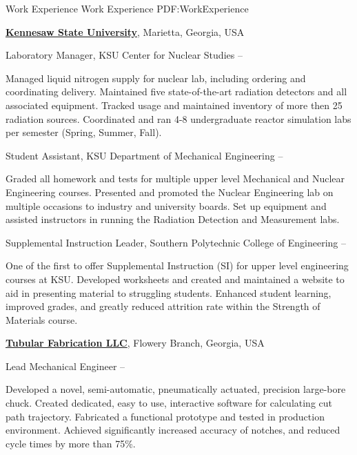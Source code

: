 \documentclass[letterpaper,MMMyyyy,nonstopmode]{resume}
\begin{document}
\begin{Body}

\Section
{Work Experience}
{Work Experience}
{PDF:WorkExperience}

\Entry
\href{http://kennesaw.edu/}
{\textbf{Kennesaw State University}},
Marietta, Georgia, USA

\Gap
\BulletItem
Laboratory Manager,
KSU Center for Nuclear Studies
\hfill
{} --
\begin{Detail}
\SubBulletItem
Managed liquid nitrogen supply for nuclear lab, including ordering and coordinating delivery.
\SubBulletItem
Maintained five state-of-the-art radiation detectors and all associated equipment.
\SubBulletItem
Tracked usage and maintained inventory of more then 25 radiation sources.
\SubBulletItem
Coordinated and ran 4-8 undergraduate reactor simulation labs per semester (Spring, Summer, Fall).
\end{Detail}

\Gap
\BulletItem
Student Assistant,
KSU Department of Mechanical Engineering
\hfill
{} --
\begin{Detail}
\SubBulletItem
Graded all homework and tests for multiple upper level Mechanical and Nuclear Engineering courses.
\SubBulletItem
Presented and promoted the Nuclear Engineering lab on multiple occasions to industry and university boards.
\SubBulletItem
Set up equipment and assisted instructors in running the Radiation Detection and Measurement labs.
\end{Detail}

\Gap
\BulletItem
Supplemental Instruction Leader,
Southern Polytechnic College of Engineering
\hfill
{} --
\begin{Detail}
\SubBulletItem
One of the first to offer Supplemental Instruction (SI) for upper level engineering courses at KSU.
\SubBulletItem
Developed worksheets and created and maintained a website to aid in presenting material to struggling students.
\SubBulletItem
Enhanced student learning, improved grades, and greatly reduced attrition rate within the Strength of Materials course.
\end{Detail}


\BigGap
\Entry
\href{http://tubularfab.com}
{\textbf{Tubular Fabrication LLC}},
Flowery Branch, Georgia, USA

\Gap
\BulletItem
Lead Mechanical Engineer
\hfill
{} --
\begin{Detail}
\SubBulletItem
Developed a novel, semi-automatic, pneumatically actuated, precision large-bore chuck.
\SubBulletItem
Created dedicated, easy to use, interactive software for calculating cut path trajectory.
\SubBulletItem
Fabricated a functional prototype and tested in production environment.
\SubBulletItem
Achieved significantly increased accuracy of notches, and reduced cycle times by more than 75\%.
\end{Detail}



\end{Body}
\end{document}
